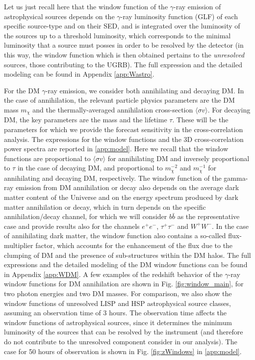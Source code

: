 Let us just recall here that the window function of the $\gamma$-ray emission of astrophysical sources depends on the $\gamma$-ray luminosity function (GLF) of each specific source-type and on their SED, and is integrated over the luminosity of the sources up to a threshold luminosity, which corresponds to the minimal luminosity that a source must posses in order to be resolved by the detector (in this way, the window function which is then obtained pertains to the \textit{unresolved} sources, those contributing to the UGRB). The full expression and the detailed modeling can be found in Appendix \ref{app:Wastro}.

For the DM $\gamma$-ray emission, we consider both annihilating and decaying DM. In the case of annihilation, the relevant particle physics parameters are the DM mass $m_\chi$ and the thermally-averaged annihilation cross-section $\langle \sigma v\rangle$. For decaying DM, the key parameters are the mass and the lifetime $\tau$. These will be the parameters for which we provide the forecast sensitivity in the cross-correlation analysis. The {expressions for the} window functions and the 3D cross-correlation power spectra are reported in {\cref{app:model}}. 
Here we recall that the window functions are proportional to $\langle \sigma v\rangle$ for annihilating DM and inversely proportional to $\tau$ in the case of decaying DM, and proportional to $m_\chi^{-2}$ and $m_\chi^{-1}$ for annihilating and decaying DM, respectively. The window function of the gamma-ray emission from DM annihilation or decay also depends on the average dark matter content of the Universe and on the energy spectrum produced by dark matter annihilation or decay, which in turn depends on the specific annihilation/decay channel, for which we will consider $b \bar b$ as the representative case and provide results also for the channels $e^+e^-$, $\tau^+\tau^-$ and $W^+W^-$. In the case of annihilating dark matter, the window function also contains a so-called flux-multiplier factor, which accounts for the enhancement of the flux due to the clumping of DM and the presence of sub-structures within the DM halos. The full expressions and the detailed modeling of the DM window functions can be found in Appendix \ref{app:WDM}. A few examples of the redshift behavior of the $\gamma$-ray window functions for DM annihilation are shown in Fig. \ref{fig:window_main}, for two photon energies and two DM masses. For comparison, we also show the window functions of unresolved LISP and HSP astrophysical source classes, assuming an observation time of 3 hours. The observation time affects the window functions of astrophysical sources, since it determines the minimum luminosity of the sources that can be resolved by the instrument (and therefore do not contribute to the unresolved component consider in our analysis). The case for 50 hours of observation is shown in Fig. \ref{fig:zWindows} in {\cref{app:model}}.

